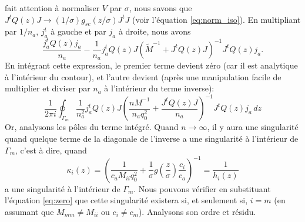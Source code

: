 \documentclass[../../main.tex]{subfiles} %
\begin{document}
fait attention à normaliser $V$ par $\sigma$, nous savons que $J^t Q(z) J \to 
\left( 1/\sigma \right) g_{sc}(z/\sigma) J^t J$ (voir l'équation 
\ref{eq:norm_iso}). En multipliant par $1 / n_a$, $j_a^t$ à gauche et par $j_a$
à droite, nous avons
\begin{equation*}
	\frac{j_a^t Q(z) j_a}{n_a} - \frac{1}{n_a} j_a^t Q(z) J 
	\left(\tilde M^{-1} + J^t Q(z) J \right)^{-1} J^t Q(z) j_a.
\end{equation*}
En intégrant cette expression, le premier terme devient zéro (car il est 
analytique à l'intérieur du contour), et l'autre devient (après une manipulation 
facile de multiplier et diviser par $n_a$ à l'intérieur du terme inverse):
\begin{equation}
	\frac{1}{2 \pi i} \oint_{\Gamma_m} \frac{1}{n_a^2} j_a^t Q(z) J 
	\left( \frac{n M^{-1}}{n_a q_0^2} + \frac{J^t Q(z) J}{n_a} \right)^{-1}
	J^t Q(z) j_a \, dz
	\label{eq:integrale}
\end{equation}
Or, analysons les pôles du terme intégré. Quand $n \to \infty$, il y aura une 
singularité quand quelque terme de la diagonale de l'inverse a une singularité 
à l'intérieur de $\Gamma_m$, c'est à dire, quand
\begin{equation*}
	\kappa_i (z) = \left( \frac{1}{c_a M_{ii} q_0^2} + \frac{1}{\sigma} g
	\left( \frac{z}{\sigma} \right) \frac{c_i}{c_a} \right)^{-1} 
	= \frac{1}{h_i (z)}
\end{equation*}
a une singularité à l'intérieur de $\Gamma_m$. Nous pouvons vérifier en 
substituant l'équation \ref{eq:zero} que cette singularité existera si, et 
seulement si, $i = m$ (en assumant que $M_{mm} \neq M_{ii}$ ou $c_i \neq c_m$).
Analysons son ordre et résidu.
\end{document}
